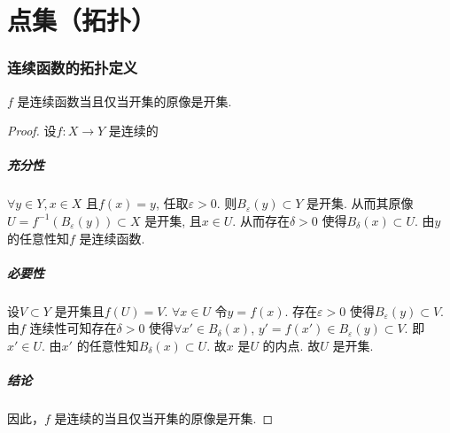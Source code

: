 \chapter{点集（拓扑）}
\subsection{连续函数的拓扑定义}
\begin{definition}
    \(f\) 是连续函数当且仅当开集的原像是开集.
\end{definition}

\begin{proof}
    设\(f: X\to Y\) 是连续的
    \paragraph{充分性}
    \(\forall y \in Y, x \in X\) 且\(f(x)=y\),
    任取\(\varepsilon >0\). 则\(B_{\varepsilon}(y) \subset Y\)
    是开集. 从而其原像\(U=f^{-1}\left( B_{\varepsilon}(y)
    \right)\subset X\) 是开集, 且\(x \in U\). 从而存在\(\delta >0\)
    使得\(B_{\delta}(x) \subset U\). 由\(y\) 的任意性知\(f\) 是连续函数.
    \paragraph{必要性}
    设\(V \subset Y\) 是开集且\(f(U)=V\). \(\forall x \in U\) 令\(y=f(x)\).
    存在\(\varepsilon >0\) 使得\(B_{\varepsilon}(y) \subset
    V\). 由\(f\) 连续性可知存在\(\delta >0\) 使得\(\forall x' \in
    B_{\delta}(x)\), \(y'=f(x')\in B_{\varepsilon}(y)
    \subset V\). 即\(x' \in U\). 由\(x'\)
    的任意性知\(B_{\delta}(x) \subset U\). 故\(x\) 是\(U\) 的内点. 故\(U\) 是开集.
    \paragraph{结论}
    因此，\(f\) 是连续的当且仅当开集的原像是开集.
\end{proof}